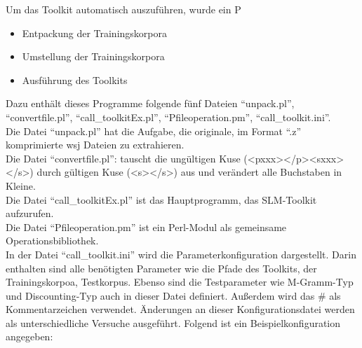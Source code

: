 
Um das Toolkit automatisch auszuf\"uhren, wurde ein P%
\begin{itemize}
	\item Entpackung der Trainingskorpora
	\item Umstellung der Trainingskorpora
	\item Ausf\"uhrung des Toolkits
\end{itemize}
Dazu enth\"alt dieses Programme folgende f\"unf Dateien "`unpack.pl"', "`convertfile.pl"', "`call\_toolkitEx.pl"', "`Pfileoperation.pm"',  "`call\_toolkit.ini"'.\\
Die Datei "`unpack.pl"' hat die Aufgabe, die originale, im Format "`.z"' komprimierte  wsj Dateien zu extrahieren.\\
Die Datei "`convertfile.pl"': tauscht die ung\"ultigen Kuse (<pxxx></p><sxxx></s>) durch g\"ultigen Kuse (<s></s>) aus und ver\"andert alle Buchstaben in Kleine. \\
Die Datei "`call\_toolkitEx.pl"' ist das Hauptprogramm, das SLM-Toolkit aufzurufen.\\ 
Die Datei "`Pfileoperation.pm"' ist ein Perl-Modul\cite{book_perl} als gemeinsame Operationsbibliothek.\\
In der Datei "`call\_toolkit.ini"'  wird die Parameterkonfiguration dargestellt. Darin enthalten sind alle ben\"otigten Parameter wie die Pfade des Toolkits, der Trainingskorpoa, Testkorpus. Ebenso sind die Testparameter wie M-Gramm-Typ und Discounting-Typ auch in dieser Datei definiert. Au\ss erdem wird das \glqq \# \grqq  als Kommentarzeichen verwendet. \"Anderungen an dieser Konfigurationsdatei werden als unterschiedliche Versuche ausgef\"uhrt. Folgend ist ein Beispielkonfiguration angegeben:

